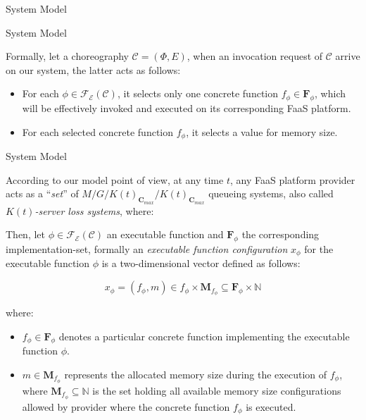 \documentclass[13.5pt]{beamer}
\newcommand{\N}{\mathbb{N}}
\begin{document}
\begin{frame}{System Model}
	
	
	
\end{frame} 
\begin{frame}{System Model}
	
Formally, let a choreography $\mathcal{C} = (\Phi,E)$, when an invocation request of $\mathcal{C}$ arrive on our system, the latter acts as follows:

\begin{itemize}
	\item For each $\phi \in \mathcal{F_E}(\mathcal{C})$, it selects only one concrete function $f_{\phi} \in \textbf{F}_{\phi}$, which will be effectively invoked and executed on its corresponding FaaS platform. 
	\item For each selected concrete function $f_{\phi}$, it selects a value for memory size.
\end{itemize}
	
\end{frame} 
\begin{frame}{System Model}
	
According to our model point of view, at any time $t$, any FaaS platform provider acts as a ``\textit{set}'' of $M/G/K(t)_{\textbf{C}_{max}}/K(t)_{\textbf{C}_{max}}$ queueing systems, also called \textit{$K(t)$-server loss systems}, where:
	
\end{frame}


\begin{frame}
	Then, let $\phi \in \mathscr{F_E}(\mathcal{C})$ an executable function and $\textbf{F}_{\phi}$ the corresponding implementation-set, formally an \textit{executable function configuration} $x_{\phi}$ for the executable function $\phi$ is a two-dimensional vector defined as follows:
	
	\begin{equation}
		x_{\phi} = (f_{\phi},m) \in f_{\phi} \times \textbf{M}_{f_{\phi}} \subseteq \textbf{F}_{\phi} \times \N
	\end{equation}
	
	where:
	
	\begin{itemize}
		\item $f_{\phi} \in \textbf{F}_{\phi}$  denotes a particular concrete function implementing the executable function $\phi$.
		\item $m \in \textbf{M}_{f_{\phi}}$ represents the allocated memory size during the execution of $f_{\phi}$, where $\textbf{M}_{f_{\phi}} \subseteq \N$ is the set holding all available memory size configurations allowed by provider where the concrete function $f_{\phi}$ is executed.
	\end{itemize}
\end{frame}
\end{document}
